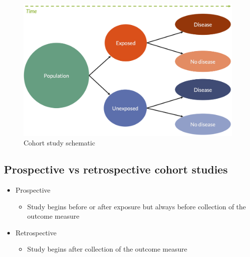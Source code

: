 \documentclass[
]{book}
\providecommand{\tightlist}{%
  \setlength{\itemsep}{0pt}\setlength{\parskip}{0pt}}
\begin{document}
\begin{figure}

{\centering \includegraphics[width=1\linewidth]{img/study_design/cohort_study_schematic} 

}

\caption{Cohort study schematic}\label{fig:unnamed-chunk-8}
\end{figure}

\hypertarget{prospective-vs-retrospective-cohort-studies}{%
\subsection{Prospective vs retrospective cohort studies}\label{prospective-vs-retrospective-cohort-studies}}

\begin{itemize}
\tightlist
\item
  Prospective

  \begin{itemize}
  \tightlist
  \item
    Study begins before or after exposure but always before collection of the outcome measure
  \end{itemize}
\item
  Retrospective

  \begin{itemize}
  \tightlist
  \item
    Study begins after collection of the outcome measure
  \end{itemize}
\end{itemize}
\end{document}
